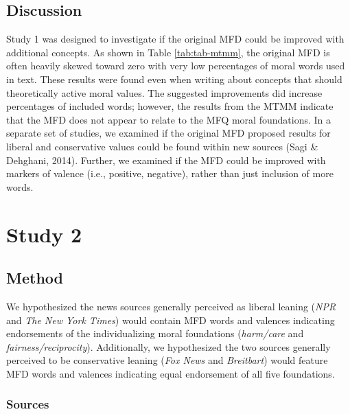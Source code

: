 \documentclass[
  man,floatsintext]{apa6}
\begin{document}
\subsection{Discussion}\label{discussion}

Study 1 was designed to investigate if the original MFD could be improved with additional concepts. As shown in Table \ref{tab:tab-mtmm}, the original MFD is often heavily skewed toward zero with very low percentages of moral words used in text. These results were found even when writing about concepts that should theoretically active moral values. The suggested improvements did increase percentages of included words; however, the results from the MTMM indicate that the MFD does not appear to relate to the MFQ moral foundations. In a separate set of studies, we examined if the original MFD proposed results for liberal and conservative values could be found within new sources (Sagi \& Dehghani, 2014). Further, we examined if the MFD could be improved with markers of valence (i.e., positive, negative), rather than just inclusion of more words.

\section{Study 2}\label{study-2}

\subsection{Method}\label{method-1}

We hypothesized the news sources generally perceived as liberal leaning
(\emph{NPR} and \emph{The New York Times}) would contain MFD words and valences
indicating endorsements of the individualizing moral foundations
(\emph{harm/care} and \emph{fairness/reciprocity}). Additionally, we hypothesized
the two sources generally perceived to be conservative leaning (\emph{Fox News}
and \emph{Breitbart}) would feature MFD words and valences indicating
equal endorsement of all five foundations.

\subsubsection{Sources}\label{sources}
\end{document}
